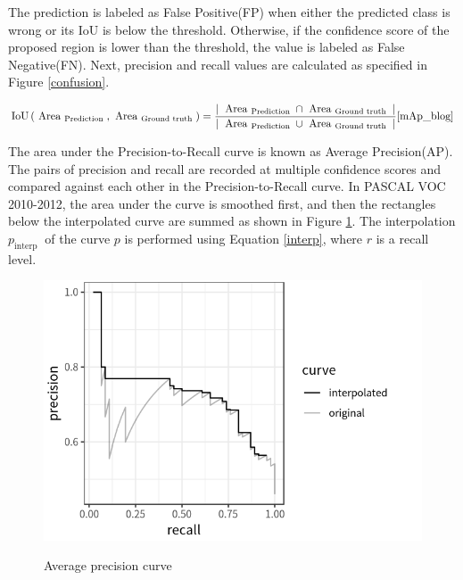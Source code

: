 \documentclass[english, 12pt, a4paper, elec, utf8, a-1b, online]{aaltothesis}
\begin{document}
The prediction is labeled as False Positive(FP) when either the predicted class is wrong or its IoU is below the threshold. Otherwise, if the confidence score of the proposed region is lower than the threshold, the value is labeled as False Negative(FN). Next, precision and recall values are calculated as specified in Figure \ref{confusion}.

\begin{equation}
\operatorname{IoU}\left(\text { Area }_{\text {Prediction }}, \text { Area }_{\text {Ground truth }}\right)=\frac{\mid \text { Area }_{\text {Prediction }} \cap \text { Area }_{\text {Ground truth }} \mid}{\mid \text { Area }_{\text {Prediction }} \cup \text { Area }_{\text {Ground truth }} \mid}
\label{iou} 
\cite{mAp_blog} 
\end{equation}

The area under the Precision-to-Recall curve is known as Average Precision(AP). The pairs of precision and recall are recorded at multiple confidence scores and compared against each other in the Precision-to-Recall curve. In PASCAL VOC 2010-2012\cite{Everingham10}, the area under the curve is smoothed first, and then the rectangles below the interpolated curve are summed as shown in Figure \ref{AUC}. The interpolation $p_{\text {interp }}$ of the curve $p$ is performed using Equation \ref{interp}, where $r$ is a recall level. 

\begin{figure}[htb]
	\begin{center}
		\includegraphics[width=12cm]{./AUC.png}
	\end{center}
	\caption{Average precision curve \cite{mAp_blog}}
	\begin{center}
		\label{AUC}
	\end{center}
\end{figure}
\FloatBarrier
\end{document}
